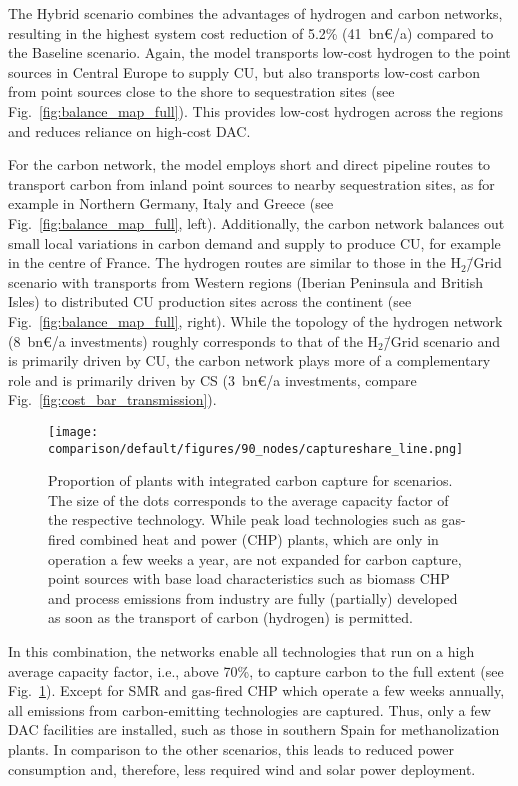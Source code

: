 \documentclass[twocolumn]{article}
\newcommand{\baselinescenario}{Baseline scenario}
\newcommand{\hydrogenscenario}{H$_2$\=/Grid scenario}
\newcommand{\hybridscenario}{Hybrid scenario}
\begin{document}
The \hybridscenario{} combines the advantages of hydrogen and carbon networks, resulting in the highest system cost reduction of 5.2\% (41~bn€/a) compared to the \baselinescenario{}. Again, the model transports low-cost hydrogen to the point sources in Central Europe to supply CU, but also transports low-cost carbon from point sources close to the shore to sequestration sites (see Fig.~\ref{fig:balance_map_full}). This provides low-cost hydrogen across the regions and reduces reliance on high-cost DAC.


For the carbon network, the model employs short and direct pipeline routes to transport carbon from inland point sources to nearby sequestration sites, as for example in Northern Germany, Italy and Greece (see Fig.~\ref{fig:balance_map_full}, left). Additionally, the carbon network balances out small local variations in carbon demand and supply to produce CU, for example in the centre of France.
The hydrogen routes are similar to those in the \hydrogenscenario{} with transports from Western regions (Iberian Peninsula and British Isles) to distributed CU production sites across the continent (see Fig.~\ref{fig:balance_map_full}, right).
While the topology of the hydrogen network (8~bn€/a investments) roughly corresponds to that of the \hydrogenscenario{} and is primarily driven by CU, the carbon network plays more of a complementary role and is primarily driven by CS (3~bn€/a investments, compare Fig.~\ref{fig:cost_bar_transmission}).


\begin{figure}[ht]
    \centering
    \texttt{[image: comparison/default/figures/90\_nodes/captureshare\_line.png]}
    \caption{Proportion of plants with integrated carbon capture for scenarios. The size of the dots corresponds to the average capacity factor of the respective technology. While peak load technologies such as gas-fired combined heat and power (CHP) plants, which are only in operation a few weeks a year, are not expanded for carbon capture, point sources with base load characteristics such as biomass CHP and process emissions from industry are fully (partially) developed as soon as the transport of carbon (hydrogen) is permitted.}
    \label{fig:captureshare_line}
\end{figure}%


In this combination, the networks enable all technologies that run on a high average capacity factor, i.e., above 70\%, to capture carbon to the full extent (see Fig.~\ref{fig:captureshare_line}). Except for SMR and gas-fired CHP which operate a few weeks annually, all emissions from carbon-emitting technologies are captured.
Thus, only a few DAC facilities are installed, such as those in southern Spain for methanolization plants. In comparison to the other scenarios, this leads to reduced power consumption and, therefore, less required wind and solar power deployment.
\end{document}
